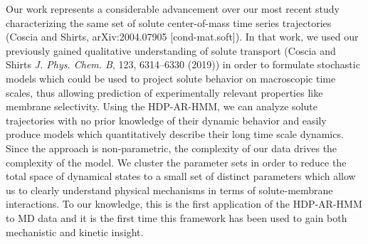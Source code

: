 \documentclass[fontsize=11pt]{article}
\begin{document}
	Our work represents a considerable advancement over our most recent study 
	characterizing the same set of solute center-of-mass time series trajectories
	(Coscia and Shirts, arXiv:2004.07905 [cond-mat.soft]). In that work, we used
	our previously gained qualitative understanding of solute transport (Coscia 
	and Shirts \textit{J. Phys. Chem. B}, 123, 6314--6330 (2019)) in order to 
	formulate stochastic models which could be used to project solute behavior
	on macroscopic time scales, thus allowing prediction of experimentally relevant
	properties like membrane selectivity. Using the HDP-AR-HMM, we can analyze solute
	trajectories with no prior knowledge of their dynamic behavior and easily produce
	models which quantitatively describe their long time scale dynamics. Since the 
	approach is non-parametric, the complexity of our data drives the complexity of
	the model. We cluster the parameter sets in order to reduce the total space of 
	dynamical states to a small set of distinct parameters which allow us to clearly
	understand physical	mechanisms in terms of solute-membrane interactions. To our 
	knowledge, this is the first application of the HDP-AR-HMM to MD data and it is
	the first time this framework has been used to gain both mechanistic and kinetic
	insight. 
	
\end{document}

